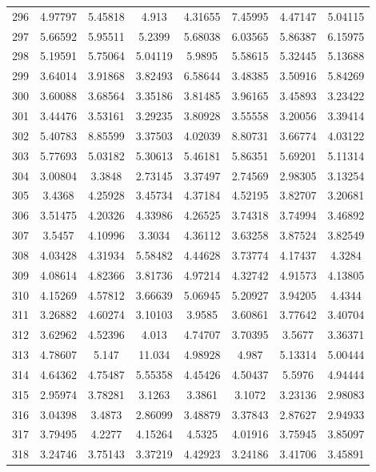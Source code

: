 \begin{center}
\begin{longtable}{cccccccc}
296 & 4.97797 & 5.45818 & 4.913 & 4.31655 & 7.45995 & 4.47147 & 5.04115\\
297 & 5.66592 & 5.95511 & 5.2399 & 5.68038 & 6.03565 & 5.86387 & 6.15975\\
298 & 5.19591 & 5.75064 & 5.04119 & 5.9895 & 5.58615 & 5.32445 & 5.13688\\
299 & 3.64014 & 3.91868 & 3.82493 & 6.58644 & 3.48385 & 3.50916 & 5.84269\\
300 & 3.60088 & 3.68564 & 3.35186 & 3.81485 & 3.96165 & 3.45893 & 3.23422\\
301 & 3.44476 & 3.53161 & 3.29235 & 3.80928 & 3.55558 & 3.20056 & 3.39414\\
302 & 5.40783 & 8.85599 & 3.37503 & 4.02039 & 8.80731 & 3.66774 & 4.03122\\
303 & 5.77693 & 5.03182 & 5.30613 & 5.46181 & 5.86351 & 5.69201 & 5.11314\\
304 & 3.00804 & 3.3848 & 2.73145 & 3.37497 & 2.74569 & 2.98305 & 3.13254\\
305 & 3.4368 & 4.25928 & 3.45734 & 4.37184 & 4.52195 & 3.82707 & 3.20681\\
306 & 3.51475 & 4.20326 & 4.33986 & 4.26525 & 3.74318 & 3.74994 & 3.46892\\
307 & 3.5457 & 4.10996 & 3.3034 & 4.36112 & 3.63258 & 3.87524 & 3.82549\\
308 & 4.03428 & 4.31934 & 5.58482 & 4.44628 & 3.73774 & 4.17437 & 4.3284\\
309 & 4.08614 & 4.82366 & 3.81736 & 4.97214 & 4.32742 & 4.91573 & 4.13805\\
310 & 4.15269 & 4.57812 & 3.66639 & 5.06945 & 5.20927 & 3.94205 & 4.4344\\
311 & 3.26882 & 4.60274 & 3.10103 & 3.9585 & 3.60861 & 3.77642 & 3.40704\\
312 & 3.62962 & 4.52396 & 4.013 & 4.74707 & 3.70395 & 3.5677 & 3.36371\\
313 & 4.78607 & 5.147 & 11.034 & 4.98928 & 4.987 & 5.13314 & 5.00444\\
314 & 4.64362 & 4.75487 & 5.55358 & 4.45426 & 4.50437 & 5.5976 & 4.94444\\
315 & 2.95974 & 3.78281 & 3.1263 & 3.3861 & 3.1072 & 3.23136 & 2.98083\\
316 & 3.04398 & 3.4873 & 2.86099 & 3.48879 & 3.37843 & 2.87627 & 2.94933\\
317 & 3.79495 & 4.2277 & 4.15264 & 4.5325 & 4.01916 & 3.75945 & 3.85097\\
318 & 3.24746 & 3.75143 & 3.37219 & 4.42923 & 3.24186 & 3.41706 & 3.45891\\

\end{longtable}
\end{center}
